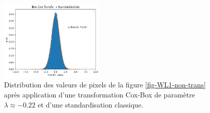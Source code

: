 \documentclass[12pt,twoside]{article}
\begin{document}
\begin{figure}
\centering
\includegraphics[width=0.45\textwidth]{fig-WL1-pixelval-trans.png}
\caption{Distribution des valeurs de pixels de la figure \ref{fig-WL1-non-trans} après application d'une transformation Cox-Box de paramètre $\lambda \approx -0.22$ et d'une standardisation classique.}
\label{fig-WL1-trans}
\end{figure}
\end{document}
